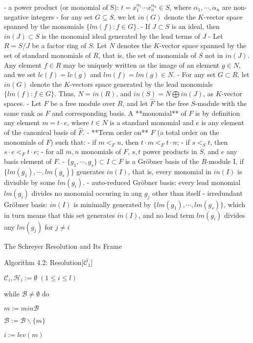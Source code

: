 \documentclass{article}
\theoremstyle{definition}
\theoremstyle{remark}
\theoremstyle{example}
\begin{document}
- a power product (or monomial of S): $t = x_1^{\alpha_1}\cdots x_n^{\alpha_n} \in S$, where $\alpha_1, \cdots, \alpha_n$ are non-negative integers
- for any set $G \subseteq S$, we let $in(G)$ denote the $K$-vector space spanned by the monomials $\{lm(f):f \in G\}$.
- If $J \subset S$ is an ideal, then $in(J) \subset S$ is the monomial ideal generated by the lead terms of $J$
- Let $R = S/J$ be a factor ring of $S$. Let $N$ denotes the $K$-vector space spanned by the set of standard monomials of $R$, that is, the set of monomials of $S$ not in $in(J)$. Any element $f \in R$ may be uniquely written as the image of an element $g \in N$, and we set $lc(f) = lc(g)$ and $lm(f) = lm(g) \in N$.
- For any set $G \subset R$, let $in(G)$ denote the $K$-vectors space generated by the lead monomials $\{lm(f):f\in G\}$. Thus, $N = in(R)$, and $in(S) = N \bigoplus in(J)$, as $K$-vector spaces.
- Let $F$ be a free module over $R$, and let $\hat{F}$ be the free $S$-module with the same rank as $F$ and corresponding basis. A **monomial** of $F$ is by definition any element $m = t \cdot e$, where $t \in N$ is a standard monomial and $e$ is any element of the canonical basis of $\hat{F}$.
- **Term order on** $F$ (a total order on the monomials of $F$) such that:
    - if $m <_F n$, then $t\cdot m <_F t \cdot n$;
    - if $s <_S t$, then $s\cdot e <_F t \cdot e$;
- for all $m, n$ monomials of $F$, $s,t$ power products in $S$, and $e$ any basis element of $F$.
- $\{g_1, \cdots, g_s\} \subset I\subset F$ is a Gröbner basis of the $R$-module I, if $\{lm(g_1), \cdots, lm(g_s)\}$ generates $in(I)$, that is, every monomial in $in(I)$ is divisible by some $lm(g_i)$.
- auto-reduced Gröbner basis: every lead monomial $lm(g_i)$ divides no monomial occuring in ang $g_j$ other than itself
- irredundant Gröbner basis: $in(I)$ is minimally generated by $\{lm(g_1), \cdots, lm(g_s)\}$, which in turn means that this set generates $in(I)$, and no lead term $lm(g_i)$ divides any $lm(g_j)$ for $j \neq i$

The Schreyer Resolution and Its Frame

Algorithm 4.2: Resolution[$\bar{{\mathcal{C}}_1}$]

${\mathcal{C}}_i,{\mathcal{H}}_i := \emptyset \;(1 \leq i \leq l)$

while $\mathcal{B} \neq \emptyset$ do

$m := min \mathcal{B}$

$\mathcal{B} := \mathcal{B} \backslash \{m\}$

$i:= lev(m)$
\end{document}
